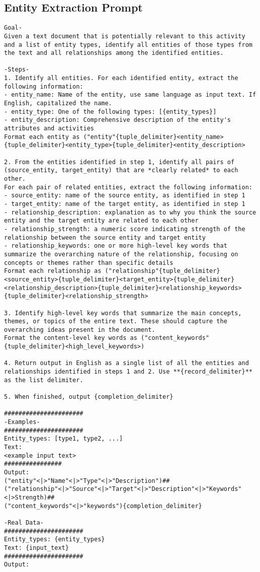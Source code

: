 \subsection{Entity Extraction Prompt}\label{prompt:entity-extraction}
\begin{lstlisting}
Goal-
Given a text document that is potentially relevant to this activity and a list of entity types, identify all entities of those types from the text and all relationships among the identified entities.

-Steps-
1. Identify all entities. For each identified entity, extract the following information:
- entity_name: Name of the entity, use same language as input text. If English, capitalized the name.
- entity_type: One of the following types: [{entity_types}]
- entity_description: Comprehensive description of the entity's attributes and activities
Format each entity as ("entity"{tuple_delimiter}<entity_name>{tuple_delimiter}<entity_type>{tuple_delimiter}<entity_description>

2. From the entities identified in step 1, identify all pairs of (source_entity, target_entity) that are *clearly related* to each other.
For each pair of related entities, extract the following information:
- source_entity: name of the source entity, as identified in step 1
- target_entity: name of the target entity, as identified in step 1
- relationship_description: explanation as to why you think the source entity and the target entity are related to each other
- relationship_strength: a numeric score indicating strength of the relationship between the source entity and target entity
- relationship_keywords: one or more high-level key words that summarize the overarching nature of the relationship, focusing on concepts or themes rather than specific details
Format each relationship as ("relationship"{tuple_delimiter}<source_entity>{tuple_delimiter}<target_entity>{tuple_delimiter}<relationship_description>{tuple_delimiter}<relationship_keywords>{tuple_delimiter}<relationship_strength>

3. Identify high-level key words that summarize the main concepts, themes, or topics of the entire text. These should capture the overarching ideas present in the document.
Format the content-level key words as ("content_keywords"{tuple_delimiter}<high_level_keywords>)

4. Return output in English as a single list of all the entities and relationships identified in steps 1 and 2. Use **{record_delimiter}** as the list delimiter.

5. When finished, output {completion_delimiter}

###################### 
-Examples-
###################### 
Entity_types: [type1, type2, ...]
Text:
<example input text>
################
Output:
("entity"<|>"Name"<|>"Type"<|>"Description")##
("relationship"<|>"Source"<|>"Target"<|>"Description"<|>"Keywords"<|>Strength)##
("content_keywords"<|>"keywords"){completion_delimiter}

-Real Data-
###################### 
Entity_types: {entity_types} 
Text: {input_text} 
###################### 
Output:
\end{lstlisting}

